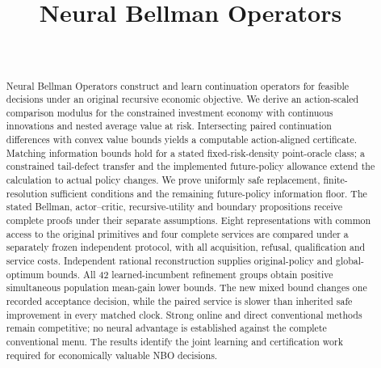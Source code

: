 \documentclass[ecta,nameyear,draft]{econsocart}
\begin{document}
\begin{frontmatter}
\title{Neural Bellman Operators}
\begin{aug}
\author[id=au1,addressref={add1}]{~}
\address[id=add1]{Peking University}
\end{aug}
\begin{abstract}
Neural Bellman Operators construct and learn continuation operators for feasible
decisions under an original recursive economic objective. We derive an
action-scaled comparison modulus for the constrained investment economy with
continuous innovations and nested average value at risk. Intersecting paired
continuation differences with convex value bounds yields a computable
action-aligned certificate. Matching information bounds hold for a stated
fixed-risk-density point-oracle class; a constrained tail-defect transfer and
the implemented future-policy allowance extend the calculation to actual policy
changes. We prove uniformly safe replacement, finite-resolution sufficient
conditions and the remaining future-policy information floor. The stated Bellman,
actor--critic, recursive-utility and boundary propositions receive complete
proofs under their separate assumptions. Eight representations with common
access to the original primitives and four complete services are compared
under a separately frozen independent protocol, with all acquisition,
refusal, qualification and service costs. Independent rational reconstruction
supplies original-policy and global-optimum bounds. All 42 learned-incumbent
refinement groups obtain positive simultaneous population mean-gain lower
bounds. The new mixed bound changes one recorded acceptance decision, while
the paired service is slower than inherited safe improvement in every matched
clock. Strong online and direct conventional methods remain competitive;
no neural advantage is established against the complete conventional
menu. The results identify the joint learning and certification work required
for economically valuable NBO decisions.
\end{abstract}
\begin{keyword}
\end{keyword}
\end{frontmatter}












\end{document}
